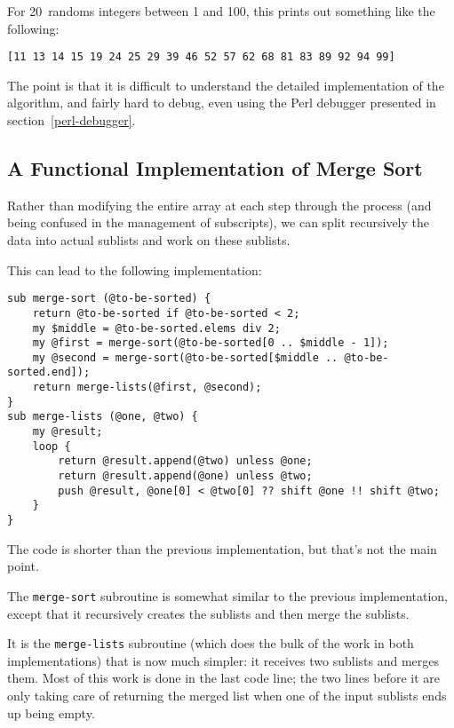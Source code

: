 For 20~randoms integers between 1 and 100, this prints 
out something like the following:

\begin{verbatim}
[11 13 14 15 19 24 25 29 39 46 52 57 62 68 81 83 89 92 94 99]
\end{verbatim}

The point is that it is difficult to understand the detailed 
implementation of the algorithm, and fairly hard to debug, even 
using the Perl debugger presented in section~\ref{perl-debugger}.

\subsection{A Functional Implementation of Merge Sort}
Rather than modifying the entire array at each step through 
the process (and being confused in the management of subscripts), 
we can split recursively the data into actual sublists and work 
on these sublists.

This can lead to the following implementation:

\begin{verbatim}
sub merge-sort (@to-be-sorted) {
    return @to-be-sorted if @to-be-sorted < 2;
    my $middle = @to-be-sorted.elems div 2;
    my @first = merge-sort(@to-be-sorted[0 .. $middle - 1]);
    my @second = merge-sort(@to-be-sorted[$middle .. @to-be-sorted.end]);
    return merge-lists(@first, @second);
}
sub merge-lists (@one, @two) {
    my @result;
    loop {
        return @result.append(@two) unless @one;
        return @result.append(@one) unless @two;
        push @result, @one[0] < @two[0] ?? shift @one !! shift @two;
    }
} 
\end{verbatim}

The code is shorter than the previous implementation, but 
that's not the main point.

The {\tt merge-sort} subroutine is somewhat similar to 
the previous implementation, except that it recursively 
creates the sublists and then merge the sublists.

It is the {\tt merge-lists} subroutine (which does the bulk 
of the work in both implementations) that is now much 
simpler: it receives two sublists and merges them. Most of this 
work is done in the last code line; the two lines before it 
are only taking care of returning the merged list when one 
of the input sublists ends up being empty.

